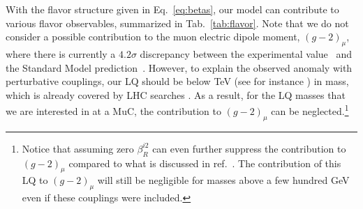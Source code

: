 \documentclass[a4paper,11pt]{article}
\newcommand{\muc}{MuC}
\begin{document}
With the flavor structure given in Eq.~\eqref{eq:betas}, our model can contribute to various flavor observables, summarized in Tab.~\ref{tab:flavor}. Note that we do not consider a possible contribution to the muon electric dipole moment, $(g-2)_{\mu}$, where there is currently a $4.2\sigma$ discrepancy between the experimental value~\cite{Abi:2021gix} and the Standard Model prediction~\cite{Aoyama:2020ynm}. 
However, to explain the observed anomaly with perturbative couplings, our LQ should be below TeV (see for instance \cite{Kowalska:2018ulj}) in mass, which is already covered by LHC searches \cite{Schmaltz:2018nls}. As a result, for the LQ masses that we are interested in at a \muc{}, the contribution to $(g-2)_{\mu}$ can be neglected.\footnote{Notice that assuming zero $\beta_R^{i2}$ can even further suppress the contribution to $(g-2)_{\mu}$ compared to what is discussed in ref.~\cite{Kowalska:2018ulj}. The contribution of this LQ to $(g-2)_{\mu}$ will still be negligible for masses above a few hundred GeV even if these couplings were included. } 
\end{document}
